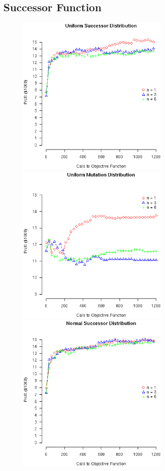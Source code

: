 \documentclass[12pt]{article}
\begin{document}
\pagebreak
\subsection{Successor Function}

\begin{figure}[!ht]
  \begin{minipage}[b]{0.5\linewidth}
    \includegraphics[width=7.5cm]{SimUNIFORMDist.eps}
  \end{minipage}
  \begin{minipage}[b]{0.5\linewidth}
    \includegraphics[width=7.5cm]{GenUNIFORMDist.eps}
  \end{minipage}
  \begin{minipage}[b]{0.5\linewidth}
    \includegraphics[width=7.5cm]{SimNORMALDist.eps}

\end{minipage}
\end{figure}
\end{document}
